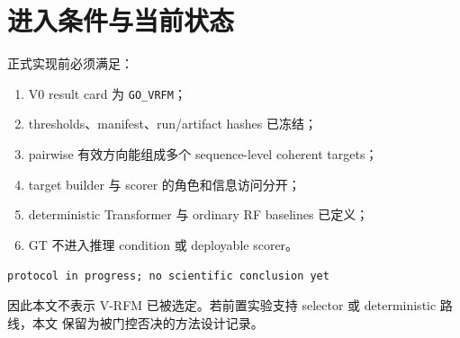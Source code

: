 \documentclass[UTF8,a4paper,11pt]{ctexart}
\begin{document}
\section{进入条件与当前状态}

正式实现前必须满足：
\begin{enumerate}
  \item V0 result card 为 \texttt{GO\_VRFM}；
  \item thresholds、manifest、run/artifact hashes 已冻结；
  \item pairwise 有效方向能组成多个 sequence-level coherent targets；
  \item target builder 与 scorer 的角色和信息访问分开；
  \item deterministic Transformer 与 ordinary RF baselines 已定义；
  \item GT 不进入推理 condition 或 deployable scorer。
\end{enumerate}

\begin{warningbox}
\texttt{protocol in progress; no scientific conclusion yet}
\end{warningbox}

因此本文不表示 V-RFM 已被选定。若前置实验支持 selector 或 deterministic 路线，本文
保留为被门控否决的方法设计记录。



\end{document}
